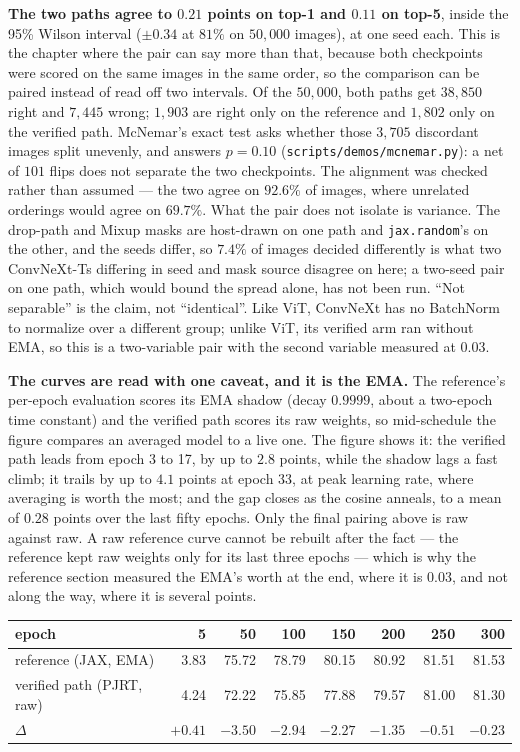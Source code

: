 \medskip\noindent\textbf{The two paths agree to $0.21$ points on top-1
and $0.11$ on top-5}, inside the 95\% Wilson interval ($\pm0.34$ at $81\%$ on $50{,}000$ images), at one seed each. This is
the chapter where the pair can say more than that, because both
checkpoints were scored on the same images in the same order, so the
comparison can be paired instead of read off two intervals. Of the
$50{,}000$, both paths get $38{,}850$ right and $7{,}445$ wrong; $1{,}903$
are right only on the reference and $1{,}802$ only on the verified
path. McNemar's exact test asks whether those $3{,}705$ discordant images
split unevenly, and answers $p = 0.10$ (\texttt{scripts/demos/\allowbreak mcnemar.py}): a
net of $101$ flips does not separate the two checkpoints. The alignment
was checked rather than assumed --- the two agree on $92.6\%$ of images,
where unrelated orderings would agree on $69.7\%$. What the pair does not
isolate is variance. The drop-path and Mixup masks are host-drawn on one
path and \texttt{jax.random}'s on the other, and the seeds differ, so
$7.4\%$ of images decided differently is what two ConvNeXt-Ts differing in
seed and mask source disagree on here; a two-seed pair on one path, which
would bound the spread alone, has not been run. ``Not separable'' is the
claim, not ``identical''. Like
ViT, ConvNeXt has no BatchNorm to normalize over a different group;
unlike ViT, its verified arm ran without EMA, so this is a two-variable
pair with the second variable measured at $0.03$.

\medskip\noindent\textbf{The curves are read with one caveat, and it is
the EMA.} The reference's per-epoch evaluation scores its EMA shadow
(decay $0.9999$, about a two-epoch time constant) and the verified path
scores its raw weights, so mid-schedule the figure compares an averaged
model to a live one. The figure shows it: the verified path leads from epoch 3 to
17, by up to $2.8$ points, while the shadow lags a fast climb; it trails
by up to $4.1$ points at epoch 33, at peak learning rate, where averaging
is worth the most; and the gap closes as the cosine anneals, to a mean of
$0.28$ points over the last fifty epochs. Only the final pairing above is
raw against raw. A raw reference curve cannot be rebuilt after the fact
--- the reference kept raw weights only for its last three epochs ---
which is why the reference section measured the EMA's worth at the end,
where it is $0.03$, and not along the way, where it is several points.

\begin{center}
\begin{tabular}{@{}l r r r r r r r@{}}
\hline
epoch & 5 & 50 & 100 & 150 & 200 & 250 & 300 \\
\hline
reference (JAX, EMA)        & 3.83 & 75.72 & 78.79 & 80.15 & 80.92 & 81.51 & 81.53 \\
verified path (PJRT, raw)   & 4.24 & 72.22 & 75.85 & 77.88 & 79.57 & 81.00 & 81.30 \\
$\Delta$                    & $+0.41$ & $-3.50$ & $-2.94$ & $-2.27$ & $-1.35$ & $-0.51$ & $-0.23$ \\
\hline
\end{tabular}
\end{center}

